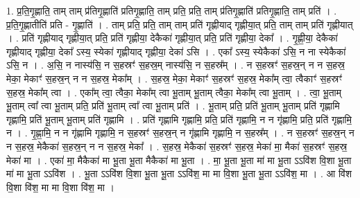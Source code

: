 \documentclass[17pt]{extarticle}
\begin{document}
1. प्र॒ति॒गृ॒ह्णाति॒ ताम् ताम् प्र॑तिगृ॒ह्णाति॑ प्रतिगृ॒ह्णाति॒ ताम् प्रति॒ प्रति॒ ताम् प्र॑तिगृ॒ह्णाति॑ प्रतिगृ॒ह्णाति॒ ताम् प्रति॑ । . प्र॒ति॒गृ॒ह्णातीति॑ प्रति - गृ॒ह्णाति॑ । . ताम् प्रति॒ प्रति॒ ताम् ताम् प्रति॑ गृह्णीयाद् गृह्णीया॒त् प्रति॒ ताम् ताम् प्रति॑ गृह्णीयात् । . प्रति॑ गृह्णीयाद् गृह्णीया॒त् प्रति॒ प्रति॑ गृह्णीया॒ देकैका॑ गृह्णीया॒त् प्रति॒ प्रति॑ गृह्णीया॒ देका᳚ । . गृ॒ह्णी॒या॒ देकैका॑ गृह्णीयाद् गृह्णीया॒ देका᳚ ऽस्य॒ स्येका॑ गृह्णीयाद् गृह्णीया॒ देका॑ ऽसि । . एका᳚ ऽस्य॒ स्येकैका॑ ऽसि॒ न ना स्येकैका॑ ऽसि॒ न । . अ॒सि॒ न नास्य॑सि॒ न स॒हस्रꣳ॑ स॒हस्र॒म् नास्य॑सि॒ न स॒हस्र᳚म् । . न स॒हस्रꣳ॑ स॒हस्र॒न् न न स॒हस्र॒ मेका॒ मेकाꣳ॑ स॒हस्र॒न् न न स॒हस्र॒ मेका᳚म् । . स॒हस्र॒ मेका॒ मेकाꣳ॑ स॒हस्रꣳ॑ स॒हस्र॒ मेका᳚म् त्वा॒ त्वैकाꣳ॑ स॒हस्रꣳ॑ स॒हस्र॒ मेका᳚म् त्वा । . एका᳚म् त्वा॒ त्वैका॒ मेका᳚म् त्वा भू॒ताम् भू॒ताम् त्वैका॒ मेका᳚म् त्वा भू॒ताम् । . त्वा॒ भू॒ताम् भू॒ताम् त्वा᳚ त्वा भू॒ताम् प्रति॒ प्रति॑ भू॒ताम् त्वा᳚ त्वा भू॒ताम् प्रति॑ । . भू॒ताम् प्रति॒ प्रति॑ भू॒ताम् भू॒ताम् प्रति॑ गृह्णामि गृह्णामि॒ प्रति॑ भू॒ताम् भू॒ताम् प्रति॑ गृह्णामि । . प्रति॑ गृह्णामि गृह्णामि॒ प्रति॒ प्रति॑ गृह्णामि॒ न न गृ॑ह्णामि॒ प्रति॒ प्रति॑ गृह्णामि॒ न । . गृ॒ह्णा॒मि॒ न न गृ॑ह्णामि गृह्णामि॒ न स॒हस्रꣳ॑ स॒हस्र॒न् न गृ॑ह्णामि गृह्णामि॒ न स॒हस्र᳚म् । . न स॒हस्रꣳ॑ स॒हस्र॒न् न न स॒हस्र॒ मेकैका॑ स॒हस्र॒न् न न स॒हस्र॒ मेका᳚ । . स॒हस्र॒ मेकैका॑ स॒हस्रꣳ॑ स॒हस्र॒ मेका॑ मा॒ मैका॑ स॒हस्रꣳ॑ स॒हस्र॒ मेका॑ मा । . एका॑ मा॒ मैकैका॑ मा भू॒ता भू॒ता मैकैका॑ मा भू॒ता । . मा॒ भू॒ता भू॒ता मा॑ मा भू॒ता ऽऽवि॑श वि॒शा भू॒ता मा॑ मा भू॒ता ऽऽवि॑श । . भू॒ता ऽऽवि॑श वि॒शा भू॒ता भू॒ता ऽऽवि॑श॒ मा मा वि॒शा भू॒ता भू॒ता ऽऽवि॑श॒ मा । . आ वि॑श वि॒शा वि॑श॒ मा मा वि॒शा वि॑श॒ मा । \newline
\end{document}
